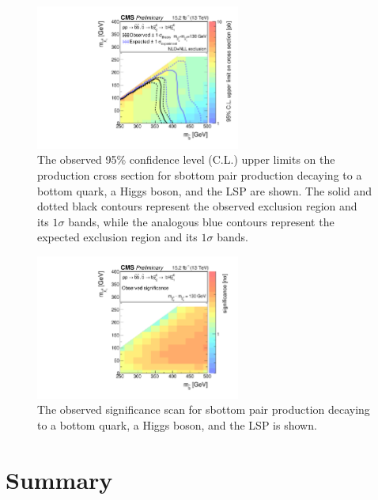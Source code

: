 \begin{figure}[ht!]
\centering
\includegraphics[width=0.6\textwidth,angle=0.]{figs/limits/T2bH_Aug2XSEC.pdf}
\caption{ 
The observed 95\% confidence level (C.L.) upper limits on the production cross section
for sbottom pair production decaying to a bottom quark, a Higgs boson, and the LSP
are shown. The solid and dotted black contours represent the observed exclusion region and
its $1\sigma$ bands, while the analogous blue contours represent the expected
exclusion region and its $1\sigma$ bands.
\label{fig:Limits}}
\end{figure}
\begin{figure}[ht!]
\centering
\includegraphics[width=0.6\textwidth,angle=0.]{hgg/T2bH_SignificanceXSEC.pdf}
\caption{ The observed significance scan for sbottom pair production
  decaying to a bottom quark, a Higgs boson, and the LSP is shown.
\label{hgg:significance}}
\end{figure}


\section{Summary}

